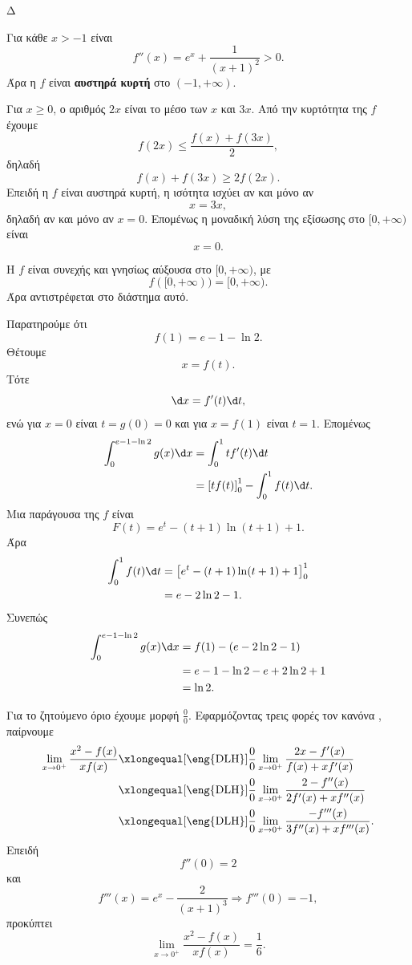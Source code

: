 \begin{thema}{Δ}
\begin{erwthma}
\item Για κάθε $x>-1$ είναι
\[
f''(x)=e^x+\frac{1}{(x+1)^2}>0.
\]
Άρα η $f$ είναι \textbf{αυστηρά κυρτή} στο $(-1,+\infty)$.

Για $x\geq0$, ο αριθμός $2x$ είναι το μέσο των $x$ και $3x$. Από την κυρτότητα της $f$ έχουμε
\[
f(2x)\leq\frac{f(x)+f(3x)}{2},
\]
δηλαδή
\[
f(x)+f(3x)\geq2f(2x).
\]
Επειδή η $f$ είναι αυστηρά κυρτή, η ισότητα ισχύει αν και μόνο αν
\[
x=3x,
\]
δηλαδή αν και μόνο αν $x=0$. Επομένως η μοναδική λύση της εξίσωσης στο $[0,+\infty)$ είναι
\[
{x=0}.
\]

\item Η $f$ είναι συνεχής και γνησίως αύξουσα στο $[0,+\infty)$, με
\[
f([0,+\infty))=[0,+\infty).
\]
Άρα αντιστρέφεται στο διάστημα αυτό.

Παρατηρούμε ότι
\[
f(1)=e-1-\ln2.
\]
Θέτουμε
\[
x=f(t).
\]
Τότε
\[
\d x=f'(t)\d t,
\]
ενώ για $x=0$ είναι $t=g(0)=0$ και για $x=f(1)$ είναι $t=1$. Επομένως
\begin{align*}
\int_0^{e-1-\ln2}g(x)\d x
&=\int_0^1t f'(t)\d t\\
&=\left[t f(t)\right]_0^1-\int_0^1f(t)\d t.
\end{align*}
Μια παράγουσα της $f$ είναι
\[
F(t)=e^t-(t+1)\ln(t+1)+1.
\]
Άρα
\begin{align*}
\int_0^1f(t)\d t
&=\left[e^t-(t+1)\ln(t+1)+1\right]_0^1\\
&=e-2\ln2-1.
\end{align*}
Συνεπώς
\begin{align*}
\int_0^{e-1-\ln2}g(x)\d x
&=f(1)-\left(e-2\ln2-1\right)\\
&=e-1-\ln2-e+2\ln2+1\\
&={\ln2}.
\end{align*}

Για το ζητούμενο όριο έχουμε μορφή $\frac{0}{0}$. Εφαρμόζοντας τρεις φορές τον κανόνα , παίρνουμε
\begin{align*}
\lim_{x\to0^+}\frac{x^2-f(x)}{xf(x)}
&\xlongequal[\text{\eng{DLH}}]{\frac{0}{0}}
\lim_{x\to0^+}\frac{2x-f'(x)}{f(x)+xf'(x)}\\
&\xlongequal[\text{\eng{DLH}}]{\frac{0}{0}}
\lim_{x\to0^+}\frac{2-f''(x)}{2f'(x)+xf''(x)}\\
&\xlongequal[\text{\eng{DLH}}]{\frac{0}{0}}
\lim_{x\to0^+}\frac{-f'''(x)}{3f''(x)+xf'''(x)}.
\end{align*}
Επειδή
\[
f''(0)=2
\]
και
\[
f'''(x)=e^x-\frac{2}{(x+1)^3}
\Rightarrow
f'''(0)=-1,
\]
προκύπτει
\[
{
\lim_{x\to0^+}\frac{x^2-f(x)}{xf(x)}
=\frac{1}{6}}.
\]
\end{erwthma}
\end{thema}

